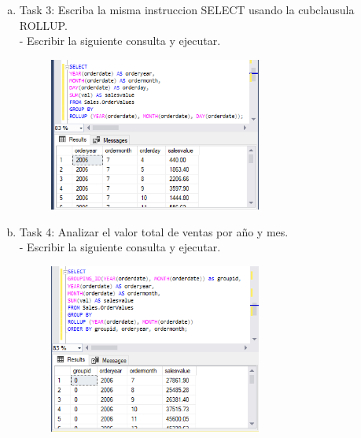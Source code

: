 \begin{enumerate}[1.]
\begin{enumerate}[a)]
\begin{figure}[H]
\begin{center}
		\end{center}
		\end{figure}
	\item Task 3: Escriba la misma instruccion SELECT usando la cubclausula ROLLUP.\\
		-  Escribir la siguiente consulta y ejecutar. 
		\begin{figure}[H]
		\begin{center}
		\includegraphics[width=7cm]{./Imagenes/e3-3}
		\end{center}
		\end{figure}
	\item Task 4: Analizar el valor total de ventas por año y mes.\\
		-  Escribir la siguiente consulta y ejecutar. 
		\begin{figure}[H]
		\begin{center}
		\includegraphics[width=7cm]{./Imagenes/e3-4}
		\end{center}
		\end{figure}
	\end{enumerate}
\end{enumerate}



